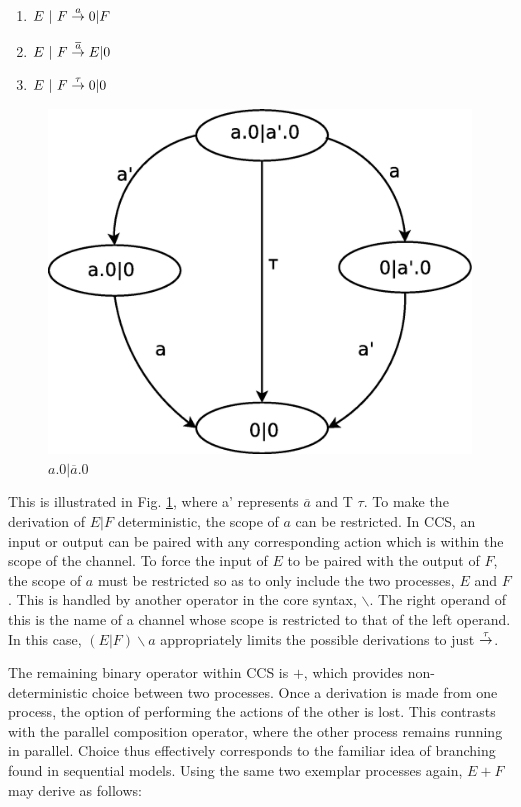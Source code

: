 \begin{enumerate}
\item $E\ |\ F \stackrel{a}{\rightarrow} 0|F$
\item $E\ |\ F \stackrel{\overline{a}}{\rightarrow} E|0$
\item $E\ |\ F \stackrel{\tau}{\rightarrow} 0|0$
\end{enumerate}

\begin{figure}  
  \centering
  \includegraphics[scale=0.5]{graph1}
  \caption{$\mathit{a.0|\overline{a}.0}$}
  \label{fig:graph1}
\end{figure}

This is illustrated in Fig. \ref{fig:graph1}, where a' represents
$\overline{a}$ and T $\tau$.  To make the derivation of $E|F$
deterministic, the scope of $a$ can be restricted.  In CCS, an input
or output can be paired with any corresponding action which is within
the scope of the channel.  To force the input of $E$ to be paired with
the output of $F$, the scope of $a$ must be restricted so as to only
include the two processes, $E$ and $F$.  This is handled by another
operator in the core syntax, $\backslash$.  The right operand of this
is the name of a channel whose scope is restricted to that of the left
operand.  In this case, $(E|F)\backslash a$ appropriately limits the
possible derivations to just $\stackrel{\tau}{\rightarrow}$.

The remaining binary operator within CCS is $+$, which provides
non-deterministic choice between two processes.  Once a derivation is
made from one process, the option of performing the actions of the other
is lost.  This contrasts with the parallel composition operator, where
the other process remains running in parallel.  Choice thus effectively
corresponds to the familiar idea of branching found in sequential
models.  Using the same two exemplar processes again, $E + F$ may derive as
follows:

